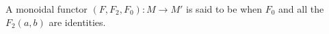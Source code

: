 A monoidal functor $(F, F_2, F_0) : M \to M'$ is said to be  when $F_0$ and all the $F_2(a, b)$ are identities.
